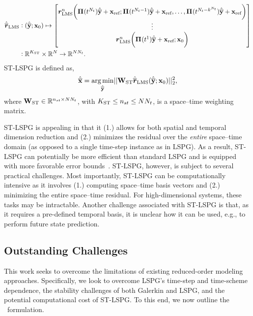 \documentclass[3p,computermodern,10pt]{elsarticle}
\begin{document}
\begin{align*}
\hat{\overline{\boldsymbol r}}_{\text{LMS}} & \vcentcolon (\hat{\mathbf{\overline{y}}} ;{{\mathbf{x}}_0}) \mapsto \begin{bmatrix}
\boldsymbol r_{\text{LMS}}^{n}\bigg( \boldsymbol \Pi^{}(t^{N_t})\hat{\mathbf{\overline{y}}} + \mathbf{x}_\text{ref}; \boldsymbol \Pi^{}(t^{N_t-1})\hat{\mathbf{\overline{y}}} + \mathbf{x}_\text{ref} ,\ldots,  \boldsymbol \Pi^{}(t^{N_t-k^{N_t}})\hat{\mathbf{\overline{y}}} + \mathbf{x}_\text{ref} \bigg) \\ 
\vdots \\
\boldsymbol r_{\text{LMS}}^{n}\bigg( \boldsymbol \Pi^{}(t^1)\hat{\mathbf{\overline{y}}} + \mathbf{x}_\text{ref}; {{\mathbf{x}}_0} \bigg) \\ 
\end{bmatrix}  \\
& \vcentcolon \mathbb{R}^{K_{\text{ST}}} \times \mathbb{R}^{N} \rightarrow \mathbb{R}^{N N_t}. 
\end{align*}
ST-LSPG is defined as,
\begin{equation*}
\hat{\mathbf{\overline{x}}} = \underset{ \hat{\mathbf{\overline{y}}} }{\text{arg\,min}}|| \mathbf{W}_{\text{ST}}  \hat{\overline{\boldsymbol r}}_{\text{LMS}}(\hat{\mathbf{\overline{y}}};{{\mathbf{x}}_0}) ||_2^2, 
\end{equation*}
where $\mathbf{W}_{\text{ST}} \in \mathbb{R}^{n_{st} \times N N_t}$, with $K_{\text{ST}} \le n_{st} \le N N_t$, is a space--time weighting matrix.


ST-LSPG is appealing in that it (1.) allows for both spatial and temporal dimension reduction and (2.) minimizes the residual over the \textit{entire} space--time domain (as opposed to a single time-step instance as in LSPG). As a result, ST-LSPG can potentially be more efficient than standard LSPG and is equipped with more favorable error bounds~\cite{choi_stlspg}. ST-LSPG, however, is subject to several practical challenges.  Most importantly, ST-LSPG can be computationally 
intensive as it involves (1.) computing space--time basis vectors and (2.) minimizing the entire space--time residual. For high-dimensional systems, these tasks may be intractable. Another challenge associated with ST-LSPG is that, as it requires a pre-defined temporal basis, it is unclear how it can be used, e.g., to perform future state prediction.
  
\subsection{Outstanding Challenges}
This work seeks to overcome the limitations of existing reduced-order modeling approaches. Specifically, 
we look to overcome LSPG's time-step and time-scheme dependence, the stability challenges of both Galerkin and LSPG, and the potential computational cost of ST-LSPG. To this end, we now outline the \methodName\ formulation. 
%
\end{document}
